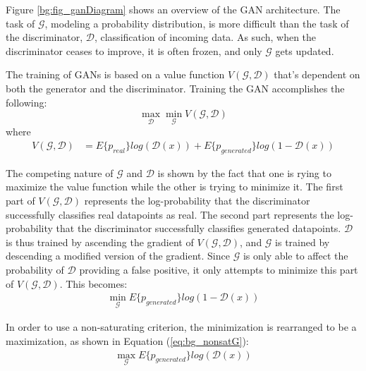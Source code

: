 	\par Figure \ref{bg:fig_ganDiagram} shows an overview of the GAN architecture. The task of $\mathcal{G}$, modeling a probability distribution, is more difficult than the task of the discriminator, $\mathcal{D}$, classification of incoming data. As such, when the discriminator ceases to improve, it is often frozen, and only $\mathcal{G}$ gets updated. 
	\par The training of GANs is based on a value function $V(\mathcal{G},\mathcal{D})$ that's dependent on both the generator and the discriminator. Training the GAN accomplishes the following: 
	\[ \max_\mathcal{D}\min_\mathcal{G} V(\mathcal{G},\mathcal{D}) \] where
	\begin{align}
		V(\mathcal{G},\mathcal{D}) &= E\{p_{real}\}log(\mathcal{D}(x)) + E\{p_{generated}\} log(1-\mathcal{D}(x))
	\end{align}
	\par The competing nature of $\mathcal{G}$ and $\mathcal{D}$ is shown by the fact that one is rying to maximize the value function while the other is trying to minimize it. The first part of $V(\mathcal{G},\mathcal{D})$ represents the log-probability that the discriminator successfully classifies real datapoints as real. The second part represents the log-probability that the discriminator successfully classifies generated datapoints. $\mathcal{D}$ is thus trained by ascending the gradient of $V(\mathcal{G},\mathcal{D})$, and $\mathcal{G}$ is trained by descending a modified version of the gradient. Since $\mathcal{G}$ is only able to affect the probability of $\mathcal{D}$ providing a false positive, it only attempts to minimize this part of $V(\mathcal{G},\mathcal{D})$. This becomes:
	\begin{align}
		\min_\mathcal{G} E\{p_{generated}\} log(1-\mathcal{D}(x))
	\end{align}
	\par In order to use a non-saturating criterion, the minimization is rearranged to be a maximization, as shown in Equation (\ref{eq:bg_nonsatG}):
	\begin{align}
		\max_\mathcal{G} E\{p_{generated}\} log(\mathcal{D}(x)) \label{eq:bg_nonsatG} 
	\end{align}
	
